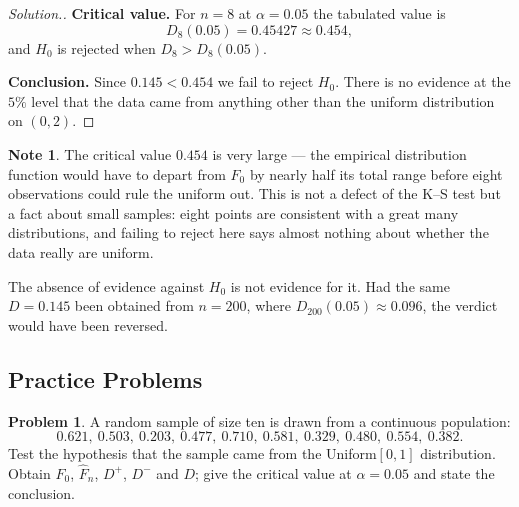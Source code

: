 \documentclass[11pt,a4paper]{article}
\theoremstyle{definition}
\newtheorem{note}[thm]{Note}
\newtheorem{problemx}{Problem}[section]
\newenvironment{problem}{\begin{problemx}}{\end{problemx}}
\newenvironment{solution}
  {\renewcommand{\qedsymbol}{}\begin{proof}[\textit{Solution}.]}
  {\end{proof}}
\begin{document}
\begin{solution}
\textbf{Critical value.} For $n=8$ at $\alpha=0.05$ the tabulated value is
$$D_8(0.05)=0.45427\approx 0.454 ,$$
and $H_0$ is rejected when $D_8>D_8(0.05)$.

\textbf{Conclusion.} Since $0.145<0.454$ we fail to reject $H_0$. There is no
evidence at the $5\%$ level that the data came from anything other than the uniform
distribution on $(0,2)$.
\end{solution}

\begin{note}
The critical value $0.454$ is very large --- the empirical distribution function
would have to depart from $F_0$ by nearly half its total range before eight
observations could rule the uniform out. This is not a defect of the K--S test but
a fact about small samples: eight points are consistent with a great many
distributions, and failing to reject here says almost nothing about whether the
data really are uniform.

The absence of evidence against $H_0$ is not evidence for it. Had the same $D=0.145$
been obtained from $n=200$, where $D_{200}(0.05)\approx 0.096$, the verdict would
have been reversed.
\end{note}









\subsection{Practice Problems}

\begin{problem}
A random sample of size ten is drawn from a continuous population:
$$0.621,\ 0.503,\ 0.203,\ 0.477,\ 0.710,\ 0.581,\ 0.329,\ 0.480,\ 0.554,\ 0.382 .$$
Test the hypothesis that the sample came from the Uniform$[0,1]$ distribution.
Obtain $F_0$, $\widehat{F}_n$, $D^{+}$, $D^{-}$ and $D$; give the critical value at
$\alpha = 0.05$ and state the conclusion.
\end{problem}
\end{document}
